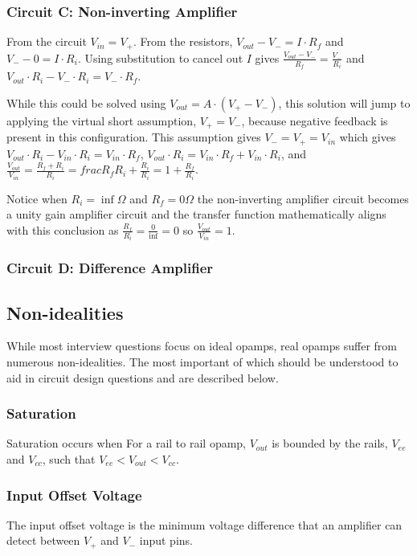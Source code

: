 \documentclass[main.tex]{subfiles}
\begin{document}
\subsubsection{Circuit C: Non-inverting Amplifier}
From the circuit $V_{in} = V_{+}$. From the resistors, $V_{out} - V_{-} = I \cdot R_f$ and $V_{-} - 0 = I \cdot R_i$. Using substitution to cancel out $I$ gives $\frac{V_{out} - V_{-}}{R_f} = \frac{V_{-}}{R_i}$ and $V_{out} \cdot R_i - V_{-} \cdot R_i = V_{-} \cdot R_f$.

While this could be solved using $V_{out} = A \cdot (V_{+} - V_{-})$, this solution will jump to applying the virtual short assumption, $V_{+} = V_{-}$, because negative feedback is present in this configuration. This assumption gives $V_{-} = V_{+} = V_{in}$ which gives $V_{out} \cdot R_i - V_{in} \cdot R_i = V_{in} \cdot R_f$, $V_{out} \cdot R_i = V_{in} \cdot R_f + V_{in} \cdot R_i$, and $\frac{V_{out}}{V_{in}} = \frac{R_f + R_i}{R_i} = frac{R_f}{R_i} + \frac{R_i}{R_i} = 1 + \frac{R_f}{R_i}$. 

Notice when $R_i = \inf \Omega$ and $R_f = 0 \Omega$ the non-inverting amplifier circuit becomes a unity gain amplifier circuit and the transfer function mathematically aligns with this conclusion as $\frac{R_f}{R_i} = \frac{0}{\inf} = 0$ so $\frac{V_{out}}{V_{in}} = 1$. 

\subsubsection{Circuit D: Difference Amplifier}

\subsection{Non-idealities}
While most interview questions focus on ideal opamps, real opamps suffer from numerous non-idealities. The most important of which should be understood to aid in circuit design questions and are described below. 

\subsubsection{Saturation}
Saturation occurs when 
For a rail to rail opamp, $V_{out}$ is bounded by the rails, $V_{ee}$ and $V_{cc}$, such that $V_{ee} < V_{out} < V_{cc}$. 

\subsubsection{Input Offset Voltage}
The input offset voltage is the minimum voltage difference that an amplifier can detect between $V_{+}$ and $V_{-}$ input pins. 
\end{document}
